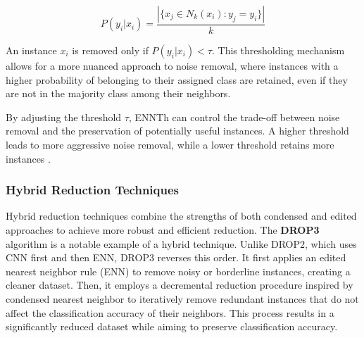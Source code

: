 \begin{equation}
P(y_i | x_i) = \frac{|\{x_j \in N_k(x_i) : y_j = y_i\}|}{k}
\end{equation}

An instance $x_i$ is removed only if $P(y_i | x_i) < \tau$. This thresholding mechanism allows for a more nuanced approach to noise removal, where instances with a higher probability of belonging to their assigned class are retained, even if they are not in the majority class among their neighbors.

By adjusting the threshold $\tau$, ENNTh can control the trade-off between noise removal and the preservation 
of potentially useful instances. A higher threshold leads to more aggressive noise removal, while a lower threshold 
retains more instances \cite{ENNTH}.



\subsubsection*{Hybrid Reduction Techniques}

Hybrid reduction techniques combine the strengths of both condensed and edited approaches to 
achieve more robust and efficient reduction. The \textbf{DROP3} algorithm \cite{wilson2000reduction} 
is a notable example of a hybrid technique. Unlike DROP2, which uses CNN first and then ENN, DROP3 reverses this order. 
It first applies an edited nearest neighbor rule (ENN) to remove noisy or borderline instances, creating a cleaner dataset.
Then, it employs a decremental reduction procedure inspired by condensed nearest neighbor to iteratively remove redundant
instances that do not affect the classification accuracy of their neighbors. This process results in a significantly 
reduced dataset while aiming to preserve classification accuracy.

